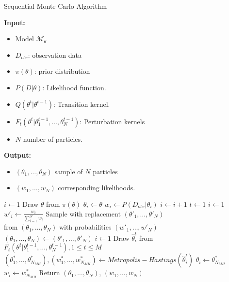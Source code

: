 \begin{algorithm}[H]
    \caption{Sequential Monte Carlo Algorithm}
    \label{alg:smc}
    \footnotesize{
        \hspace*{\algorithmicindent} \textbf{Input:}
        \begin{itemize}[noitemsep]
            \item Model $\mathcal{M}_\theta$
            \item $D_{obs}$: observation data
            \item $\pi(\theta)$: prior distribution
            \item $P(D|\theta)$: Likelihood function.
            \item $Q(\theta^t|\theta^{t-1})$: Transition kernel.
            \item $F_t(\theta^t|\theta_1^{t-1},\ldots,\theta_N^{t-1})$: Perturbation kernels
            \item $N$ number of particles.
        \end{itemize}
        \hspace*{\algorithmicindent} \textbf{Output:}
        \begin{itemize}[noitemsep]
            \item $(\theta_1,\ldots,\theta_N)$ sample of $N$ particles
            \item $(w_1,\ldots,w_N)$ corresponding likelihoods.
        \end{itemize}
    }
    \begin{algorithmic}[1]
        \State $i \leftarrow 1$
         
        \State Draw $\theta$ from $\pi(\theta)$
        \State $\theta_i \leftarrow \theta$
        \State $w_i \leftarrow P(D_{obs}|\theta_i)$
        \State $i \leftarrow i + 1$
        \EndWhile
        \State $t \leftarrow 1$
        \State $i \leftarrow 1$ 
        \State $w'_i \leftarrow \frac{w_i}{\sum_{i=1}^N w_i} $
        \EndWhile
        \State Sample with replacement $(\theta'_1,\ldots,\theta'_N)$  \\\hspace{1.5cm} from $(\theta_1,\ldots,\theta_N)$ with probabilities $(w'_1,\ldots,w'_N)$
        \State $(\theta_1,\ldots,\theta_N) \leftarrow (\theta'_1,\ldots,\theta'_N)$
        \State $i \leftarrow 1$
         
        \State Draw $\hat{\theta}^t_i$ from $F_t(\theta^t | \theta^{t-1}_1,\ldots,\theta^{t-1}_N), 1\leq t \leq M$
        \State $(\theta^*_1,\ldots,\theta^*_{N_{MH}}), (w^*_1,\ldots,w^*_{N_{MH}}) \leftarrow Metropolis-Hastings(\hat{\theta}^t_i)$
        \State $\theta_i \leftarrow \theta^*_{N_{MH}}$
        \State $w_i \leftarrow w^*_{N_{MH}}$
        \EndWhile
        \EndWhile
        \State Return $(\theta_1,\ldots,\theta_{N})$, $(w_1,\ldots,w_{N})$
        \EndProcedure
    \end{algorithmic}
\end{algorithm}
